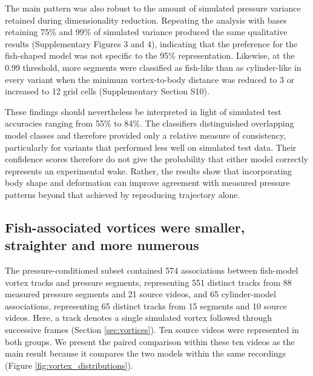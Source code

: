 \documentclass[openacc]{rsproca_new}
\begin{document}
The main pattern was also robust to the amount of simulated pressure variance retained during dimensionality reduction. Repeating the analysis with bases retaining 75\% and 99\% of simulated variance produced the same qualitative results (Supplementary Figures 3 and 4), indicating that the preference for the fish-shaped model was not specific to the 95\% representation. Likewise, at the 0.99 threshold, more segments were classified as fish-like than as cylinder-like in every variant when the minimum vortex-to-body distance was reduced to 3 or increased to 12 grid cells (Supplementary Section S10).

These findings should nevertheless be interpreted in light of simulated test accuracies ranging from 55\% to 84\%. The classifiers distinguished overlapping model classes and therefore provided only a relative measure of consistency, particularly for variants that performed less well on simulated test data. Their confidence scores therefore do not give the probability that either model correctly represents an experimental wake. Rather, the results show that incorporating body shape and deformation can improve agreement with measured pressure patterns beyond that achieved by reproducing trajectory alone.

\subsection{Fish-associated vortices were smaller, straighter and more numerous}

The pressure-conditioned subset contained 574 associations between fish-model vortex tracks and pressure segments, representing 551 distinct tracks from 88 measured pressure segments and 21 source videos, and 65 cylinder-model associations, representing 65 distinct tracks from 15 segments and 10 source videos. Here, a track denotes a single simulated vortex followed through successive frames (Section \ref{sec:vortices}). Ten source videos were represented in both groups. We present the paired comparison within these ten videos as the main result because it compares the two models within the same recordings (Figure \ref{fig:vortex_distributions}).
\end{document}
